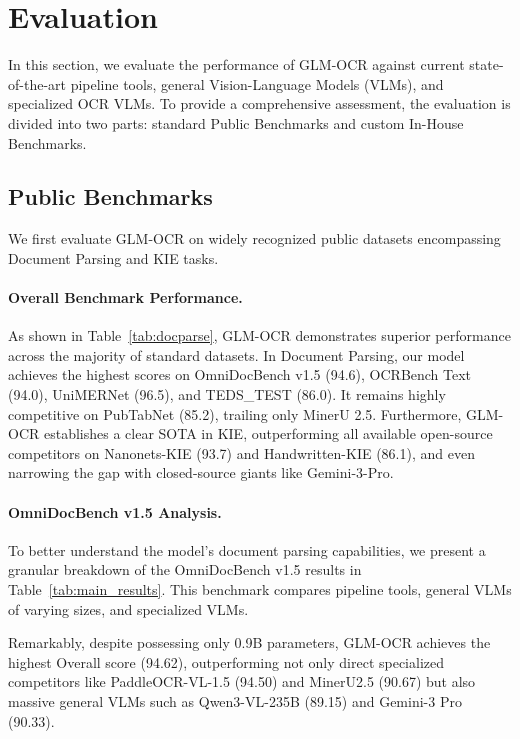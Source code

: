 \section{Evaluation}

In this section, we evaluate the performance of GLM-OCR against current state-of-the-art pipeline tools, general Vision-Language Models (VLMs), and specialized OCR VLMs. To provide a comprehensive assessment, the evaluation is divided into two parts: standard Public Benchmarks and custom In-House Benchmarks.

\subsection{Public Benchmarks}

We first evaluate GLM-OCR on widely recognized public datasets encompassing Document Parsing and KIE tasks.

\paragraph{Overall Benchmark Performance.} As shown in Table~\ref{tab:docparse}, GLM-OCR demonstrates superior performance across the majority of standard datasets. In Document Parsing, our model achieves the highest scores on OmniDocBench v1.5 (94.6), OCRBench Text (94.0), UniMERNet (96.5), and TEDS\_TEST (86.0). It remains highly competitive on PubTabNet (85.2), trailing only MinerU 2.5. Furthermore, GLM-OCR establishes a clear SOTA in KIE, outperforming all available open-source competitors on Nanonets-KIE (93.7) and Handwritten-KIE (86.1), and even narrowing the gap with closed-source giants like Gemini-3-Pro.



\paragraph{OmniDocBench v1.5 Analysis.} To better understand the model's document parsing capabilities, we present a granular breakdown of the OmniDocBench v1.5 results in Table~\ref{tab:main_results}. This benchmark compares pipeline tools, general VLMs of varying sizes, and specialized VLMs.

Remarkably, despite possessing only 0.9B parameters, GLM-OCR achieves the highest Overall score (94.62), outperforming not only direct specialized competitors like PaddleOCR-VL-1.5 (94.50) and MinerU2.5 (90.67) but also massive general VLMs such as Qwen3-VL-235B (89.15) and Gemini-3 Pro (90.33).

